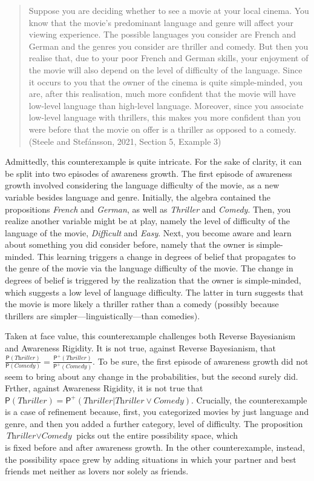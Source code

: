\documentclass[
  11pt,
  dvipsnames,enabledeprecatedfontcommands]{scrartcl}
\newcommand{\pr}[1]{\ensuremath{\mathsf{P}(#1)}}
\newcommand{\ppr}[2]{\ensuremath{\mathsf{P}^{#1}(#2)}}
\begin{document}
\begin{quote}
Suppose you are deciding whether to see a movie at your local cinema.
You know that the movie's predominant language and genre will affect
your viewing experience. The possible languages you consider are French
and German and the genres you consider are thriller and comedy. But then
you realise that, due to your poor French and German skills, your
enjoyment of the movie will also depend on the level of difficulty of
the language. Since it occurs to you that the owner of the cinema is
quite simple-minded, you are, after this realisation, much more
confident that the movie will have low-level language than high-level
language. Moreover, since you associate low-level language with
thrillers, this makes you more confident than you were before that the
movie on offer is a thriller as opposed to a comedy. (Steele and
Stefánsson, 2021, Section 5, Example 3)
\end{quote}

\noindent Admittedly, this counterexample is quite intricate. For the
sake of clarity, it can be split into two episodes of awareness growth.
The first episode of awareness growth involved considering the language
difficulty of the movie, as a new variable besides language and genre.
Initially, the algebra contained the propositions \textit{French} and
\textit{German}, as well as \textit{Thriller} and \textit{Comedy}. Then,
you realize another variable might be at play, namely the level of
difficulty of the language of the movie, \textit{Difficult} and
\textit{Easy}. Next, you become aware and learn about something you did
consider before, namely that the owner is simple-minded. This learning
triggers a change in degrees of belief that propagates to the genre of
the movie via the language difficulty of the movie. The change in
degrees of belief is triggered by the realization that the owner is
simple-minded, which suggests a low level of language difficulty. The
latter in turn suggests that the movie is more likely a thriller rather
than a comedy (possibly because thrillers are
simpler---linguistically---than comedies).

Taken at face value, this counterexample challenges both Reverse
Bayesianism and Awareness Rigidity. It is not true, against Reverse
Bayesianism, that
\(\frac{\pr{\textit{Thriller}}}{\pr{\textit{Comedy}}}=\frac{\ppr{+}{\textit{Thriller}}}{\ppr{+}{\textit{Comedy}}}\).
To be sure, the first episode of awareness growth did not seem to bring
about any change in the probabilities, but the second surely did.
Frther, against Awareness Rigidity, it is not true that
\(\pr{\textit{Thriller}}=\ppr{+}{\textit{Thriller} \vert \textit{Thriller}\vee \textit{Comedy}}\).
Crucially, the counterexample is a case of refinement because, first,
you categorized movies by just language and genre, and then you added a
further category, level of difficulty. The proposition
\(\textit{Thriller}\vee \textit{Comedy}\) picks out the entire
possibility space, which\\
is fixed before and after awareness growth. In the other counterexample,
instead, the possibility space grew by adding situations in which your
partner and best friends met neither as lovers nor solely as friends.
\end{document}
